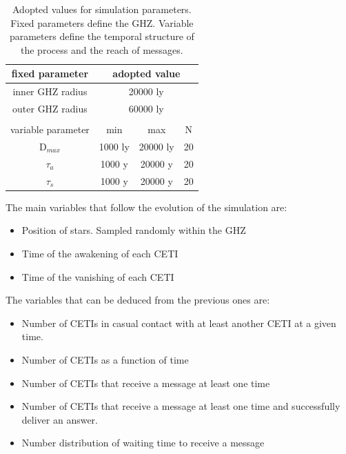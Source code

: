 \documentclass[crop]{CSLB}%
\begin{document}
\setlength{\tabcolsep}{10pt}
\begin{table}
\centering
\begin{tabular}{cccc}
\hline
   fixed parameter & \multicolumn{3}{c}{adopted value}\hfill \\
\hline
   inner GHZ radius\hfill & \multicolumn{3}{c}{20000 ly}\\
   outer GHZ radius & \multicolumn{3}{c}{60000 ly}\\ \\
\hline
   variable parameter & min & max & N \\
\hline
   D$_{max}$ & 1000 ly & 20000 ly & 20\\
   $\tau_{a}$ & 1000 y & 20000 y & 20\\
   $\tau_{s}$ & 1000 y & 20000 y & 20\\
\hline
\end{tabular}
\caption{Adopted values for simulation parameters. Fixed parameters
   define the GHZ.  Variable parameters define the temporal structure
   of the process and the reach of messages.}
\label{T_parameters}
\end{table}



The main variables that follow the evolution of the simulation are:

\begin{itemize}
   \item Position of stars.  Sampled randomly within the GHZ
   \item Time of the awakening of each CETI
   \item Time of the vanishing of each CETI
\end{itemize}

The variables that can be deduced from the previous ones are:

\begin{itemize}
   \item Number of CETIs in casual contact with at least another CETI
      at a given time.
   \item Number of CETIs as a function of time
   \item Number of CETIs that receive a message at least one time
   \item Number of CETIs that receive a message at least one time and
      successfully deliver an answer.
   \item Number distribution of waiting time to receive a message
\end{itemize}
\end{document}
